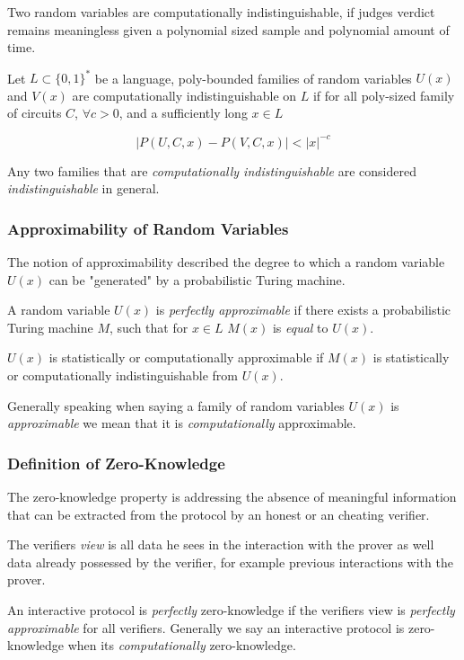 Two random variables are computationally indistinguishable, if judges verdict remains meaningless given a polynomial sized sample and polynomial amount of time.

\bigskip

Let $L \subset \{0,1\}^*$ be a language, poly-bounded families of random variables $U(x)$ and $V(x)$ are computationally indistinguishable on $L$ if for all poly-sized family of circuits $C$, $\forall c > 0$, and a sufficiently long $x \in L$

$$|P(U, C, x) - P(V, C, x)| < |x|^{-c}$$

Any two families that are \textit{computationally indistinguishable} are considered  \textit{indistinguishable} in general.

\subsubsection{Approximability of Random Variables}%

The notion of approximability described the degree to which a random variable $U(x)$ can be "generated" by a probabilistic Turing machine.

\bigskip

A random variable $U(x)$ is \textit{perfectly approximable} if there exists a probabilistic Turing machine $M$, such that for $x \in L$ $M(x)$ is \textit{equal} to $U(x)$.

$U(x)$ is statistically or computationally approximable if $M(x)$ is statistically or computationally indistinguishable from $U(x)$.

\bigskip

Generally speaking when saying a family of random variables $U(x)$ is \textit{approximable} we mean that it is \textit{computationally} approximable.

\subsubsection{Definition of Zero-Knowledge}

The zero-knowledge property is addressing the absence of meaningful information that can be extracted from the protocol by an honest or an cheating verifier.


The verifiers \textit{view} is all data he sees in the interaction with the prover as well data already possessed by the verifier, for example previous interactions with the prover.

\bigskip

An interactive protocol is \textit{perfectly} zero-knowledge if the verifiers view is \textit{perfectly approximable} for all verifiers. Generally we say an interactive protocol is zero-knowledge when its \textit{computationally} zero-knowledge.